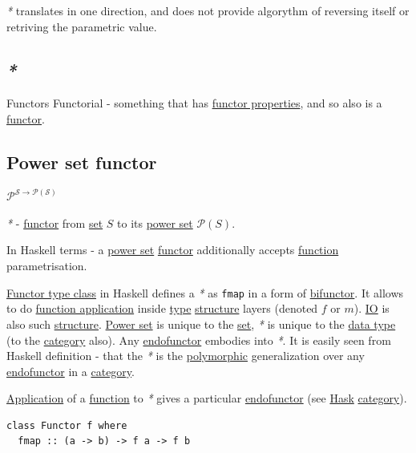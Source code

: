 \documentclass[a4paper,14pt,oneside]{book}
\begin{document}
\emph{*} translates in one direction, and does not provide algorythm of reversing itself or retriving the parametric value.

\subsection{\emph{*}}
\label{sec:org0d51ac3}

\label{orge2a0506}Functors
\label{org3209073}Functorial - something that has \hyperref[org849cfaf]{functor properties}, and so also is a \hyperref[org3bd25a7]{functor}.

\subsection{\label{org3725b0c}Power set functor}
\label{sec:org2214597}
\(\mathcal{P^{S \to P(S)}}\)

\emph{*} - \hyperref[org3bd25a7]{functor} from \hyperref[org42d889f]{set} \(S\) to its \hyperref[org6dc76ed]{power set} \(\mathcal{P}(S)\).

In Haskell terms - a \hyperref[org6dc76ed]{power set} \hyperref[org3bd25a7]{functor} additionally accepts \hyperref[orgaa71573]{function} parametrisation.

\hyperref[org9241fac]{Functor type class} in Haskell defines a \emph{*} as \texttt{fmap} in a form of \hyperref[orgfa7fd98]{bifunctor}. It allows to do \hyperref[org6bae374]{function application} inside \hyperref[org4e3af4c]{type} \hyperref[org3025fd4]{structure} layers (denoted \(f\) or \(m\)). \hyperref[org3c23801]{IO} is also such \hyperref[org3025fd4]{structure}.
\hyperref[org6dc76ed]{Power set} is unique to the \hyperref[org42d889f]{set}, \emph{*} is unique to the \hyperref[org54f2079]{data type} (to the \hyperref[orgfd021ba]{category} also).
Any \hyperref[orga185fc0]{endofunctor} embodies into \emph{*}. It is easily seen from Haskell definition - that the \emph{*} is the \hyperref[org480159e]{polymorphic} generalization over any \hyperref[orga185fc0]{endofunctor} in a \hyperref[orgfd021ba]{category}.

\hyperref[orgb2e28f5]{Application} of a \hyperref[orgaa71573]{function} to \emph{*} gives a particular \hyperref[orga185fc0]{endofunctor} (see \hyperref[orgc90b86f]{Hask} \hyperref[orgfd021ba]{category}).

\begin{verbatim}
class Functor f where
  fmap :: (a -> b) -> f a -> f b
\end{verbatim}
\end{document}
